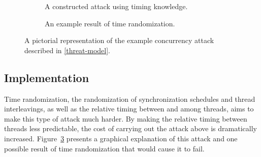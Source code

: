 \begin{figure}
\begin{subfigure}{\columnwidth}
		\caption{A constructed attack using timing knowledge.}
		\label{fig_attack}
	\end{subfigure}
	\begin{subfigure}{\columnwidth}
		\caption{An example result of time randomization.}
		\label{fig_thwart}
	\end{subfigure}
	\caption{A pictorial representation of the example concurrency attack described in \autoref{threat-model}.}
	\label{fig_exploitation}
\end{figure}
\subsection{Implementation}\label{implementation}
Time randomization, the randomization of synchronization schedules and thread interleavings, as well as the relative timing between and among threads, aims to make this type of attack much harder.
By making the relative timing between threads less predictable, the cost of carrying out the attack above is dramatically increased.
Figure~\ref{fig_exploitation} presents a graphical explanation of this attack and one possible result of time randomization that would cause it to fail.

